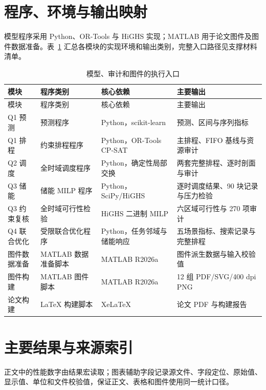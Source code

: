 \appendix

\section{程序、环境与输出映射}

模型程序采用 Python、OR-Tools 与 HiGHS 实现；MATLAB 用于论文图件及图件数据准备。表~\ref{tab:code-entry} 汇总各模块的实现环境和输出类别，完整入口路径见支撑材料清单。

\begin{longtable}{@{}p{}p{}p{}p{}@{}}
\caption{模型、审计和图件的执行入口}\label{tab:code-entry}\\
\toprule
模块 & 程序类别 & 核心依赖 & 主要输出 \\
\midrule
\endfirsthead
\toprule
模块 & 程序类别 & 核心依赖 & 主要输出 \\
\midrule
\endhead
Q1 预测 & 预测程序 & Python，scikit-learn & 预测、区间与序列指标 \\
Q1 排程 & 约束排程程序 & Python，OR-Tools CP-SAT & 主排程、FIFO 基线与资源审计 \\
Q2 调度 & 全时域调度程序 & Python，确定性局部交换 & 两套完整排程、逐时剖面与审计 \\
Q3 储能 & 储能 MILP 程序 & Python，SciPy/HiGHS & 逐时调度结果、90 块记录与压力检验 \\
Q3 约束复核 & 全时域可行性检验 & HiGHS 二进制 MILP & 六区域可行性与 270 项审计 \\
Q4 联合优化 & 受限联合优化程序 & Python，任务邻域与储能响应 & 五场景指标、搜索记录与完整排程 \\
图件数据准备 & MATLAB 数据准备脚本 & MATLAB R2026a & 图件派生数据与输入校验值 \\
图件构建 & MATLAB 图件脚本 & MATLAB R2026a & 12 组 PDF/SVG/400 dpi PNG \\
论文构建 & LaTeX 构建脚本 & XeLaTeX & 论文 PDF 与构建报告 \\
\bottomrule
\end{longtable}

\section{主要结果与来源索引}

正文中的性能数字由结果宏读取；图表辅助字段记录源文件、字段定位、原始值、显示值、单位和文件校验值，保证正文、表格和图件使用同一统计口径。

